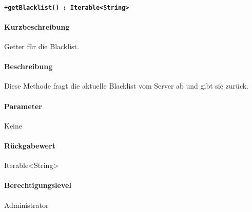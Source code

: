 \paragraph{\texttt{+getBlacklist() : Iterable<String>}}%
\paragraph*{Kurzbeschreibung}
Getter für die Blacklist.
\paragraph*{Beschreibung}
Diese Methode fragt die aktuelle Blacklist vom Server ab und gibt sie zurück.
\paragraph*{Parameter}
Keine
\paragraph*{Rückgabewert}
Iterable<String>
\paragraph*{Berechtigungslevel}
Administrator